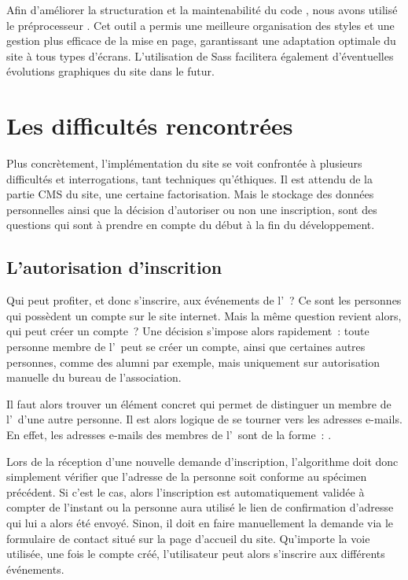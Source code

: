 Afin d’améliorer la structuration et la maintenabilité du code , nous avons utilisé le préprocesseur . Cet outil a permis une meilleure organisation des styles et une gestion plus efficace de la mise en page, garantissant une adaptation optimale du site à tous types d’écrans. L’utilisation de Sass facilitera également d’éventuelles évolutions graphiques du site dans le futur.


\section{Les difficultés rencontrées}
\label{sec:difficultes}

Plus concrètement, l'implémentation du site se voit confrontée à plusieurs difficultés et interrogations, tant techniques qu'éthiques. Il est attendu de la partie CMS du site, une certaine factorisation. Mais le stockage des données personnelles ainsi que la décision d'autoriser ou non une inscription, sont des questions qui sont à prendre en compte du début à la fin du développement.

\subsection{L'autorisation d'inscrition}
\label{subsec:autorisation-inscription}

Qui peut profiter, et donc s'inscrire, aux événements de l'\ofni~? Ce sont les personnes qui possèdent un compte sur le site internet. Mais la même question revient alors, qui peut créer un compte~? Une décision s'impose alors rapidement~: toute personne membre de l'\univ\ peut se créer un compte, ainsi que certaines autres personnes, comme des alumni par exemple, mais uniquement sur autorisation manuelle du bureau de l'association.

Il faut alors trouver un élément concret qui permet de distinguer un membre de l'\univ\ d'une autre personne. Il est alors logique de se tourner vers les adresses e-mails. En effet, les adresses e-mails des membres de l'\univ\ sont de la forme~: .

Lors de la réception d'une nouvelle demande d'inscription, l'algorithme doit donc simplement vérifier que l'adresse  de la personne soit conforme au spécimen précédent. Si c'est le cas, alors l'inscription est automatiquement validée à compter de l'instant ou la personne aura utilisé le lien de confirmation d'adresse qui lui a alors été envoyé. Sinon, il doit en faire manuellement la demande via le formulaire de contact situé sur la page d'accueil du site. Qu'importe la voie utilisée, une fois le compte créé, l'utilisateur peut alors s'inscrire aux différents événements.

